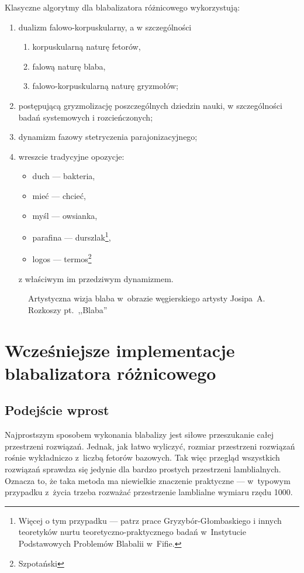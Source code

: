 \documentclass[licencjacka]{pracamgr}
\begin{document}
Klasyczne algorytmy dla blabalizatora różnicowego wykorzystują:
\begin{enumerate}
\item dualizm falowo-korpuskularny, a w szczególności
  \begin{enumerate}
  \item korpuskularną naturę fetorów,
  \item falową naturę blaba,
  \item falowo-korpuskularną naturę gryzmołów;
  \end{enumerate}
\item postępującą gryzmolizację poszczególnych dziedzin nauki, w
  szczególności badań systemowych i rozcieńczonych;
\item dynamizm fazowy stetryczenia parajonizacyjnego;
\item wreszcie tradycyjne opozycje:
  \begin{itemize}
  \item duch --- bakteria,
  \item mieć --- chcieć,
  \item myśl --- owsianka,
  \item parafina --- durszlak\footnote{Więcej o tym przypadku --- patrz
      prace Gryzybór-Głombaskiego i innych teoretyków nurtu
      teoretyczno-praktycznego badań w~Instytucie Podstawowych
      Problemów Blabalii w~Fifie.},
  \item logos --- termos\footnote{Szpotański}
  \end{itemize}
  z właściwym im przedziwym dynamizmem.
\end{enumerate}

\begin{figure}[tp]
  \centering
  \caption{Artystyczna wizja blaba w~obrazie węgierskiego artysty
    Josipa~A. Rozkoszy pt.~,,Blaba''}
\end{figure}

\chapter{Wcześniejsze implementacje blabalizatora
  różnicowego}\label{r:losers}

\section{Podejście wprost}

Najprostszym sposobem wykonania blabalizy jest siłowe przeszukanie
całej przestrzeni rozwiązań.  Jednak, jak łatwo wyliczyć, rozmiar
przestrzeni rozwiązań rośnie wykładniczo z~liczbą fetorów bazowych.
Tak więc przegląd wszystkich rozwiązań sprawdza się jedynie dla bardzo
prostych przestrzeni lamblialnych.  Oznacza to, że taka metoda ma
niewielkie znaczenie praktyczne --- w~typowym przypadku z~życia trzeba
rozważać przestrzenie lamblialne wymiaru rzędu 1000.
\end{document}
